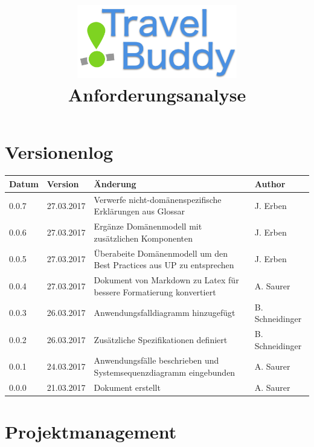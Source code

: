 \documentclass[a4paper,10pt,xetex]{article}
\title{
  \includegraphics[width=7cm]{travel-buddy_white}\\[\bigskipamount]
  Anforderungsanalyse\\[\bigskipamount]
}
\author{\documentauthors}
\date{\parbox{\linewidth}{\centering%
  IT15TA ZH \hspace*{3cm} Gruppe 3\endgraf\bigskip
  \documentdate\endgraf
}}
\begin{document}
\maketitle\newpage

{
\hypersetup{linkcolor=black}
\setcounter{tocdepth}{3}
\tableofcontents
\listoffigures
}

\newpage

\section{Versionenlog}\label{versionenlog}

\tabulinesep=1.2mm

\begin{longtabu} to \textwidth { | l | l | X[l] | l | }
  \hline
  \textbf{Datum} & \textbf{Version} & \textbf{Änderung} & \textbf{Author} \\
  \hline
  \endhead
  
  0.0.7 & 27.03.2017 & Verwerfe nicht-domänenspezifische Erklärungen aus Glossar & J. Erben\\
  \hline

  
  0.0.6 & 27.03.2017 & Ergänze Domänenmodell mit zusätzlichen Komponenten & J. Erben\\
  \hline
  
  0.0.5 & 27.03.2017 & Überabeite Domänenmodell um den Best Practices aus UP zu entsprechen & J. Erben\\
  \hline

  0.0.4 & 27.03.2017 & Dokument von Markdown zu Latex für bessere Formatierung konvertiert & A. Saurer\\
  \hline

  0.0.3 & 26.03.2017 & Anwendungsfalldiagramm hinzugefügt & B. Schneidinger\\
  \hline

  0.0.2 & 26.03.2017 & Zusätzliche Spezifikationen definiert & B. Schneidinger\\
  \hline

  0.0.1 & 24.03.2017 & Anwendungsfälle beschrieben und Systemsequenzdiagramm eingebunden & A. Saurer\\
  \hline

  0.0.0 & 21.03.2017 & Dokument erstellt & A. Saurer\\
  \hline
\end{longtabu}
\newpage

\section{Projektmanagement}\label{projektmanagement}
\end{document}
